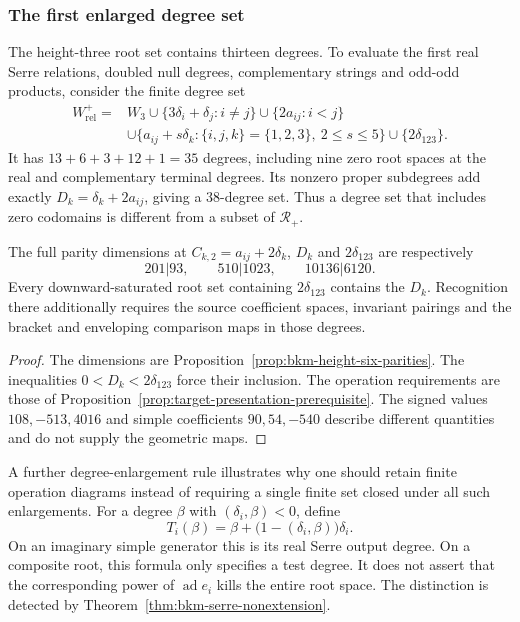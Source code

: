 \subsubsection*{The first enlarged degree set}

The height-three root set contains thirteen degrees. To evaluate the
first real Serre relations, doubled null degrees, complementary
strings and odd-odd products, consider the finite degree set
\[
 \begin{split}
 W_{\mathrm{rel}}^+={}&W_3
 \cup\{3\delta_i+\delta_j:i\ne j\}
 \cup\{2a_{ij}:i<j\}\\
 &\cup\{a_{ij}+s\delta_k:\{i,j,k\}=\{1,2,3\},\ 2\leq s\leq5\}
 \cup\{2\delta_{123}\}.
 \end{split}
\]
It has $13+6+3+12+1=35$ degrees, including nine zero root spaces
at the real and complementary terminal degrees. Its nonzero
proper subdegrees add exactly
$D_k=\delta_k+2a_{ij}$, giving a $38$-degree set. Thus a degree
set that includes zero codomains is different from a subset of
$\mathcal R_+$.

\begin{proposition}
\label{prop:target-admissibility-obstruction-wrel}
The full parity dimensions at
$C_{k,2}=a_{ij}+2\delta_k$, $D_k$ and $2\delta_{123}$ are
respectively
\[
 201|93,\qquad510|1023,\qquad10136|6120.
\]
Every downward-saturated root set containing $2\delta_{123}$
contains the $D_k$. Recognition there additionally requires the
source coefficient spaces, invariant pairings and the bracket and
enveloping comparison maps in those degrees.
\end{proposition}
\begin{proof}
The dimensions are Proposition~\ref{prop:bkm-height-six-parities}.
The inequalities $0<D_k<2\delta_{123}$ force their inclusion.
The operation requirements are those of
Proposition~\ref{prop:target-presentation-prerequisite}.
The signed values $108,-513,4016$ and simple coefficients
$90,54,-540$ describe different quantities and do not supply the
geometric maps.
\end{proof}

A further degree-enlargement rule illustrates why one should retain
finite operation diagrams instead of requiring a single finite
set closed under all such enlargements. For a degree $\beta$ with
$(\delta_i,\beta)<0$, define
\[
 T_i(\beta)=\beta+\bigl(1-(\delta_i,\beta)\bigr)\delta_i.
\]
On an imaginary simple generator this is its real Serre output
degree. On a composite root, this formula only specifies a test degree.
It does not assert that the corresponding power of
$\operatorname{ad}e_i$ kills the entire root space.
The distinction is detected by
Theorem~\ref{thm:bkm-serre-nonextension}.

